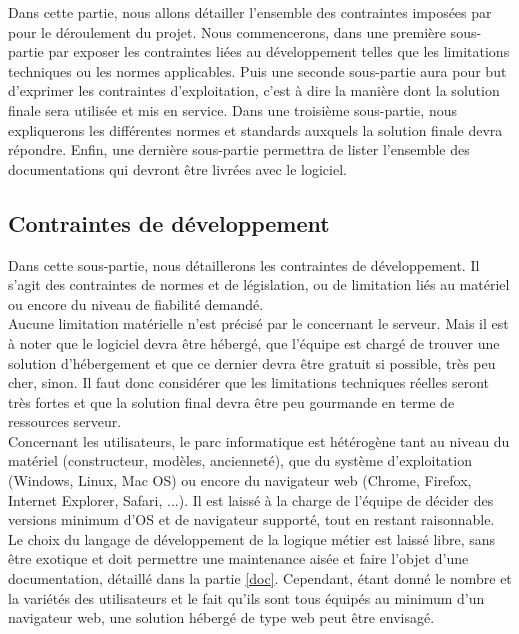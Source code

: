 Dans cette partie, nous allons détailler l'ensemble des contraintes imposées par \nomClient{} pour le déroulement du projet. Nous commencerons, dans une première sous-partie par exposer les contraintes liées au développement telles que les limitations techniques ou les normes applicables. Puis une seconde sous-partie aura pour but d'exprimer les contraintes d'exploitation, c'est à dire la manière dont la solution finale sera utilisée et mis en service. Dans une troisième sous-partie, nous expliquerons les différentes normes et standards auxquels la solution finale devra répondre. Enfin, une dernière sous-partie permettra de lister l'ensemble des documentations qui devront être livrées avec le logiciel.


\subsection{Contraintes de développement}
Dans cette sous-partie, nous détaillerons les contraintes de développement. Il s'agit des contraintes de normes et de législation, ou de limitation liés au matériel ou encore du niveau de fiabilité demandé.\\


Aucune limitation matérielle n'est précisé par le \client{} concernant le serveur. Mais il est à noter que le logiciel devra être hébergé, que l'équipe \PICCourt{} est chargé de trouver une solution d'hébergement et que ce dernier devra être gratuit si possible, très peu cher, sinon. Il faut donc considérer que les limitations techniques réelles seront très fortes et que la solution final devra être peu gourmande en terme de ressources serveur.\\

Concernant les utilisateurs, le parc informatique est hétérogène tant au niveau du matériel (constructeur, modèles, ancienneté), que du système d'exploitation (Windows, Linux, Mac OS) ou encore du navigateur web (Chrome, Firefox, Internet Explorer, Safari, ...). Il est laissé à la charge de l'équipe \PICCourt{} de décider des versions minimum d'OS et de navigateur supporté, tout en restant raisonnable.\\


Le choix du langage de développement de la logique métier est laissé libre, sans être exotique et doit permettre une maintenance aisée et faire l'objet d'une documentation, détaillé dans la partie \ref{doc}. Cependant, étant donné le nombre et la variétés des utilisateurs et le fait qu'ils sont tous équipés au minimum d'un navigateur web, une solution hébergé de type web peut être envisagé.\\


